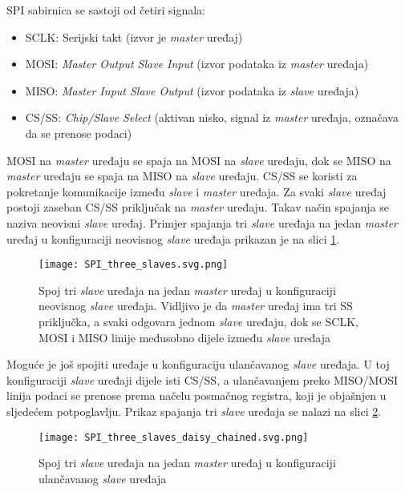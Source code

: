 SPI sabirnica se sastoji od četiri signala:
\begin{itemize}
	\item SCLK: Serijski takt (izvor je \textit{master} uređaj)
	\item MOSI: \textit{Master Output Slave Input} (izvor podataka iz \textit{master} uređaja)
	\item MISO: \textit{Master Input Slave Output} (izvor podataka iz \textit{slave} uređaja)
	\item CS/SS: \textit{Chip/Slave Select} (aktivan nisko, signal iz \textit{master} uređaja, označava da se prenose podaci)
\end{itemize}
MOSI na \textit{master} uređaju se spaja na MOSI na \textit{slave} uređaju, dok se MISO na \textit{master} uređaju se spaja na MISO na \textit{slave} uređaju. CS/SS se koristi za pokretanje komunikacije između \textit{slave} i \textit{master} uređaja. Za svaki \textit{slave} uređaj postoji zaseban CS/SS priključak na \textit{master} uređaju. Takav način spajanja se naziva neovisni \textit{slave} uređaj. Primjer spajanja tri \textit{slave} uređaja na jedan \textit{master} uređaj u konfiguraciji neovisnog \textit{slave} uređaja prikazan je na slici \ref{fig:spi_three_slaves}.
\begin{figure}[H]
	\centering
	\texttt{[image: SPI\_three\_slaves.svg.png]}
	\caption{Spoj tri \textit{slave} uređaja na jedan \textit{master} uređaj u konfiguraciji neovisnog \textit{slave} uređaja. Vidljivo je da \textit{master} uređaj ima tri SS priključka, a svaki odgovara jednom \textit{slave} uređaju, dok se SCLK, MOSI i MISO linije međusobno dijele između \textit{slave} uređaja \cite{spi_wikipedia}}
	\label{fig:spi_three_slaves}
\end{figure}
Moguće je još spojiti uređaje u konfiguraciju ulančavanog \textit{slave} uređaja. U toj konfiguraciji \textit{slave} uređaji dijele isti CS/SS, a ulančavanjem preko MISO/MOSI linija podaci se prenose prema načelu posmačnog registra, koji je objašnjen u sljedećem potpoglavlju. Prikaz spajanja tri \textit{slave} uređaja se nalazi na slici \ref{fig:SPI_three_slaves_daisy_chained}.
\begin{figure}[H]
	\centering
	\texttt{[image: SPI\_three\_slaves\_daisy\_chained.svg.png]}
	\caption{Spoj tri \textit{slave} uređaja na jedan \textit{master} uređaj u konfiguraciji ulančavanog \textit{slave} uređaja \cite{spi_wikipedia}}
	\label{fig:SPI_three_slaves_daisy_chained}
\end{figure}

